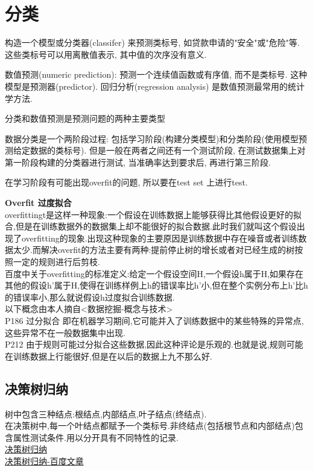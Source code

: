 \documentclass{article}
\begin{document}
\section{分类}
构造一个模型或分类器(classifer) 来预测类标号, 如贷款申请的"安全"或"危险"等. 这些类标号可以用离散值表示, 其中值的次序没有意义.

数值预测(numeric prediction): 预测一个连续值函数或有序值, 而不是类标号. 这种模型是预测器(predictor). 回归分析(regression analysis) 是数值预测最常用的统计学方法.

分类和数值预测是预测问题的两种主要类型

数据分类是一个两阶段过程: 包括学习阶段(构建分类模型)和分类阶段(使用模型预测给定数据的类标号). 但是一般在两者之间还有一个测试阶段, 在测试数据集上对第一阶段构建的分类器进行测试, 当准确率达到要求后, 再进行第三阶段.

在学习阶段有可能出现overfit的问题, 所以要在test set 上进行test.

\bigskip
\textbf{Overfit 过度拟合}\\
overfittingt是这样一种现象:一个假设在训练数据上能够获得比其他假设更好的拟合,但是在训练数据外的数据集上却不能很好的拟合数据.此时我们就叫这个假设出现了overfitting的现象.出现这种现象的主要原因是训练数据中存在噪音或者训练数据太少.而解决overfit的方法主要有两种:提前停止树的增长或者对已经生成的树按照一定的规则进行后剪枝.\\
百度中关于overfitting的标准定义:给定一个假设空间H,一个假设h属于H,如果存在其他的假设h'属于H,使得在训练样例上h的错误率比h'小,但在整个实例分布上h'比h的错误率小,那么就说假设h过度拟合训练数据.\\
以下概念由本人摘自<数据挖掘-概念与技术>\\
P186 过分拟合 即在机器学习期间,它可能并入了训练数据中的某些特殊的异常点,这些异常不在一般数据集中出现.\\
P212 由于规则可能过分拟合这些数据,因此这种评论是乐观的.也就是说,规则可能在训练数据上行能很好,但是在以后的数据上九不那么好.

\subsection{决策树归纳}
树中包含三种结点:根结点,内部结点,叶子结点(终结点).\\
在决策树中,每一个叶结点都赋予一个类标号.非终结点(包括根节点和内部结点)包含属性测试条件.用以分开具有不同特性的记录.\\
\href{http://blog.csdn.net/raby_gyl/article/details/15034431}{决策树归纳}\\
\href{http://wenzhang.baidu.com/article/view?key=50fb6d3f2f6a2c97-1393127697}{决策树归纳-百度文章}\\
\end{document}
